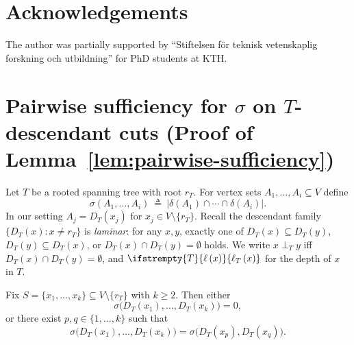 \documentclass[11pt,letterpaper]{article}
\newcommand{\paren}[1]{\left( #1 \right)}
\newcommand{\level}[2][]{%
	\ifstrempty{#1}{%
		\ell\paren{#2}
	}{%
		\ell_{#1}\paren{#2}
	}%
}
\begin{document}
\section{Acknowledgements}
The author was partially supported by ``Stiftelsen för teknisk vetenskaplig forskning och utbildning'' for PhD students at KTH.

\appendix
\section{Pairwise sufficiency for $\sigma$ on $T$-descendant cuts (Proof of Lemma~\ref{lem:pairwise-sufficiency})}

\label{app:pairwise}

Let $T$ be a rooted spanning tree with root $r_T$. For vertex sets
$A_1,\ldots,A_i\subseteq V$ define
\[
\sigma(A_1,\ldots,A_i)\ \triangleq\ \bigl|\delta(A_1)\cap\cdots\cap\delta(A_i)\bigr|.
\]
In our setting $A_j=D_T(x_j)$ for $x_j\in V\setminus\{r_T\}$.
Recall the descendant family $\{D_T(x):x\neq r_T\}$ is \emph{laminar}:
for any $x,y$, exactly one of $D_T(x)\subseteq D_T(y)$, $D_T(y)\subseteq D_T(x)$,
or $D_T(x)\cap D_T(y)=\emptyset$ holds. We write $x\perp_T y$ iff
$D_T(x)\cap D_T(y)=\emptyset$, and $\level[T]{x}$ for the depth of $x$ in $T$.

\begin{lemma}\label{lemA:pairwise}
Fix $S=\{x_1,\ldots,x_k\}\subseteq V\setminus\{r_T\}$ with $k\ge2$.
Then either
\[
\sigma\bigl(D_T(x_1),\ldots,D_T(x_k)\bigr)=0,
\]
or there exist $p,q\in\{1,\ldots,k\}$ such that
\[
\sigma\bigl(D_T(x_1),\ldots,D_T(x_k)\bigr)
=\sigma\bigl(D_T(x_p),D_T(x_q)\bigr).
\]
\end{lemma}
\end{document}
